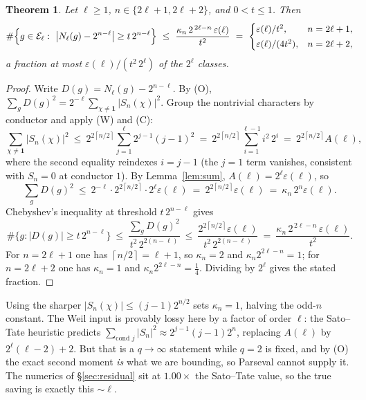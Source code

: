 \documentclass[10pt]{article}
\theoremstyle{plain}
\newtheorem{theorem}{Theorem}
\newcommand{\E}{\mathcal E}
\newcommand{\ceil}[1]{\left\lceil #1\right\rceil}
\newcommand{\one}{\mathbf 1}
\begin{document}
\begin{theorem}\label{thm:A}
Let $\ell\ge1$, $n\in\{2\ell+1,2\ell+2\}$, and $0<t\le1$. Then
\[
 \#\Bigl\{g\in\E_\ell:\ \bigl|N_\ell(g)-2^{n-\ell}\bigr|\ge t\,2^{n-\ell}\Bigr\}
 \ \le\ \frac{\kappa_n\,2^{\,2\ell-n}\,\varepsilon(\ell)}{t^2}
 \ =\ \begin{cases}\varepsilon(\ell)/t^2,&n=2\ell+1,\\[2pt]
                   \varepsilon(\ell)/(4t^2),&n=2\ell+2,\end{cases}
\]
a fraction at most $\varepsilon(\ell)/(t^2\,2^{\ell})$ of the $2^\ell$ classes.
\end{theorem}

\begin{proof}
Write $D(g)=N_\ell(g)-2^{n-\ell}$. By (O),
$\sum_g D(g)^2=2^{-\ell}\sum_{\chi\neq\one}|S_n(\chi)|^2$. Group the nontrivial
characters by conductor and apply (W) and (C):
\[
 \sum_{\chi\neq\one}|S_n(\chi)|^2
 \ \le\ 2^{2\ceil{n/2}}\sum_{j=1}^{\ell}2^{j-1}(j-1)^2
 \ =\ 2^{2\ceil{n/2}}\sum_{i=1}^{\ell-1}i^2\,2^i
 \ =\ 2^{2\ceil{n/2}}A(\ell),
\]
where the second equality reindexes $i=j-1$ (the $j=1$ term vanishes,
consistent with $S_n=0$ at conductor $1$). By Lemma~\ref{lem:sum},
$A(\ell)=2^{\ell}\varepsilon(\ell)$, so
\[
 \sum_g D(g)^2\ \le\ 2^{-\ell}\cdot2^{2\ceil{n/2}}\cdot2^{\ell}\varepsilon(\ell)
 \ =\ 2^{2\ceil{n/2}}\varepsilon(\ell)\ =\ \kappa_n\,2^{n}\varepsilon(\ell).
\]
Chebyshev's inequality at threshold $t\,2^{n-\ell}$ gives
\[
 \#\{g:|D(g)|\ge t\,2^{n-\ell}\}
 \ \le\ \frac{\sum_g D(g)^2}{t^2\,2^{2(n-\ell)}}
 \ \le\ \frac{2^{2\ceil{n/2}}\varepsilon(\ell)}{t^2\,2^{2(n-\ell)}}
 \ =\ \frac{\kappa_n\,2^{\,2\ell-n}\,\varepsilon(\ell)}{t^2}.
\]
For $n=2\ell+1$ one has $\ceil{n/2}=\ell+1$, so $\kappa_n=2$ and
$\kappa_n2^{2\ell-n}=1$; for $n=2\ell+2$ one has $\kappa_n=1$ and
$\kappa_n2^{2\ell-n}=\tfrac14$. Dividing by $2^\ell$ gives the stated fraction.
\end{proof}

Using the sharper $|S_n(\chi)|\le(j-1)2^{n/2}$ sets $\kappa_n=1$, halving the
odd-$n$ constant. The Weil input is provably lossy here by a factor of order
$\ell$: the Sato--Tate heuristic predicts
$\sum_{\text{cond }j}|S_n|^2\approx2^{j-1}(j-1)2^{n}$, replacing $A(\ell)$ by
$2^\ell(\ell-2)+2$. But that is a $q\to\infty$ statement while $q=2$ is fixed,
and by (O) the exact second moment \emph{is} what we are bounding, so Parseval
cannot supply it. The numerics of \S\ref{sec:residual} sit at $1.00\times$ the
Sato--Tate value, so the true saving is exactly this $\sim\ell$.
\end{document}
